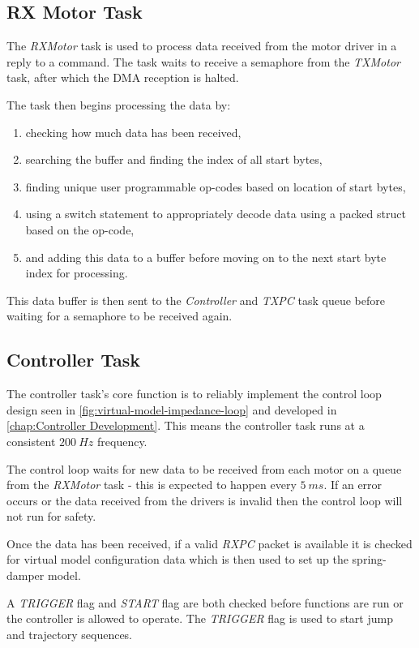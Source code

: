 \subsection{RX Motor Task}
The \textit{RXMotor} task is used to process data received from the motor driver in a reply to a command. The task waits to receive a semaphore from the \textit{TXMotor} task, after which the DMA reception is halted. 

The task then begins processing the data by:

\begin{enumerate}
\item checking how much data has been received,
\item  searching the buffer and finding the index of all start bytes,
\item finding unique user programmable op-codes based on location of start bytes,
\item using a switch statement to appropriately decode data using a packed struct based on the op-code,
\item and adding this data to a buffer before moving on to the next start byte index for processing.
\end{enumerate}

This data buffer is then sent to the \textit{Controller} and \textit{TXPC} task queue before waiting for a semaphore to be received again.

\subsection{Controller Task}

The controller task's core function is to reliably implement the control loop design seen in \cref{fig:virtual-model-impedance-loop} and developed in \cref{chap:Controller Development}. This means the controller task runs at a consistent $200\ Hz$ frequency.

The control loop waits for new data to be received from each motor on a queue from the \textit{RXMotor} task - this is expected to happen every $5\ ms$. If an error occurs or the data received from the drivers is invalid then the control loop will not run for safety. 

Once the data has been received, if a valid \textit{RXPC} packet is available it is checked for virtual model configuration data which is then used to set up the spring-damper model.

A \textit{TRIGGER} flag and \textit{START} flag are both checked before functions are run or the controller is allowed to operate. The \textit{TRIGGER} flag is used to start jump and trajectory sequences.

